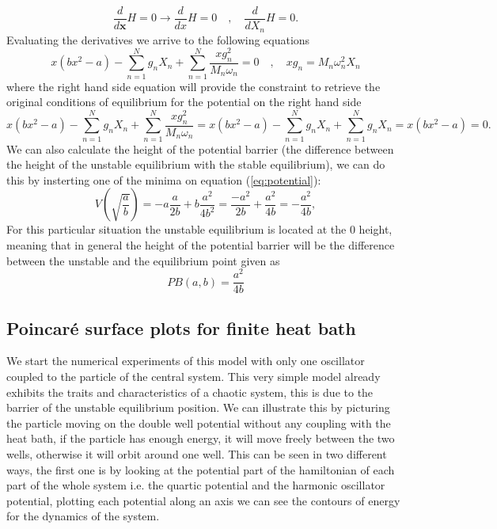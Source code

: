 \begin{equation}
\frac{d}{d\textbf{x}}H=0\rightarrow \frac{d}{dx}H =0 \quad , \quad \frac{d}{dX_n}H  = 0.
\end{equation}
Evaluating the derivatives we arrive to the following equations
\begin{equation}
x(bx^2-a)-\sum_{n=1}^N g_n X_n +\sum_{n=1}^N \frac{xg_n^2}{M_n\omega_n}=0 \quad , \quad xg_n=M_n\omega_n^2 X_n 
\end{equation}
where the right hand side equation will provide the constraint to retrieve the original conditions of equilibrium for the potential on the right hand side
\begin{equation}
x(bx^2-a)-\sum_{n=1}^N g_n X_n +\sum_{n=1}^N \frac{xg_n^2}{M_n\omega_n}= x(bx^2-a)-\sum_{n=1}^N g_n X_n +\sum_{n=1}^N g_n X_n=x(bx^2-a)=0.
\end{equation}
We can also calculate the height of the potential barrier (the difference between the height of the unstable equilibrium with the stable equilibrium), we can do this by insterting one of the minima on equation (\ref{eq:potential}):
\begin{equation}
V(\sqrt{\frac{a}{b}})=-a\frac{a}{2b}+b\frac{a^2}{4b^2}=\frac{-a^2}{2b}+\frac{a^2}{4b}=-\frac{a^2}{4b},
\end{equation}
For this particular situation the unstable equilibrium is located at the $0$ height, meaning that in general the height of the potential barrier will be the difference between the unstable and the equilibrium point given as
\begin{equation}
PB(a,b)=\frac{a^2}{4b}
\label{eq:PB_eq}
\end{equation}





\subsection{Poincaré surface plots for finite heat bath}
We start the numerical experiments of this model with only one oscillator coupled to the particle of the central system. This very simple model already exhibits the traits and characteristics of a chaotic system, this is due to the barrier of the unstable equilibrium position. We can illustrate this by picturing the particle moving on the double well potential without any coupling with the heat bath, if the particle has enough energy, it will move freely between the two wells, otherwise it will orbit around one well. This can be seen in two different ways, the first one is by looking at the potential part of the hamiltonian of each part of the whole system i.e. the quartic potential and the harmonic oscillator potential, plotting each potential along an axis we can see the contours of energy for the dynamics of the system.

